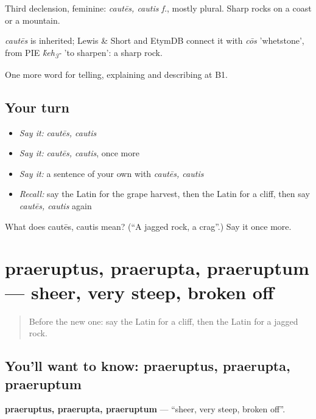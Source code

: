 Third declension, feminine: \emph{cautēs, cautis f.}, mostly plural. Sharp rocks on a coast or a mountain.

\begin{cousinweb}
\emph{cautēs} is inherited; Lewis \& Short and EtymDB connect it with \emph{cōs} 'whetstone', from PIE \emph{\'{k}eh\textsubscript{3}-} 'to sharpen': a sharp rock.
\end{cousinweb}

\begin{grammarlens}[title={What you've built}]
One more word for telling, explaining and describing at B1.
\end{grammarlens}

\subsection*{Your turn}
\begin{itemize}
\raggedright
  \item \emph{Say it:} \emph{cautēs, cautis}
  \item \emph{Say it:} \emph{cautēs, cautis}, once more
  \item \emph{Say it:} a sentence of your own with \emph{cautēs, cautis}
  \item \emph{Recall:} say the Latin for the grape harvest, then the Latin for a cliff, then say \emph{cautēs, cautis} again
\end{itemize}

\begin{tcolorbox}[breakable,colback=teal!4,colframe=teal!35!black,title={Before you move on}]
What does cautēs, cautis mean? (\textquotedblleft{}A jagged rock, a crag\textquotedblright{}.) Say it once more.
\end{tcolorbox}
\section[praeruptus, praerupta, praeruptum]{praeruptus, praerupta, praeruptum — sheer, very steep, broken off}

\label{lesson:LA-C480-praeruptus}



\begin{quote}
Before the new one: say the Latin for a cliff, then the Latin for a jagged rock.
\end{quote}

\subsection*{You'll want to know: praeruptus, praerupta, praeruptum}
\textbf{praeruptus, praerupta, praeruptum} — \textquotedblleft{}sheer, very steep, broken off\textquotedblright{}.

